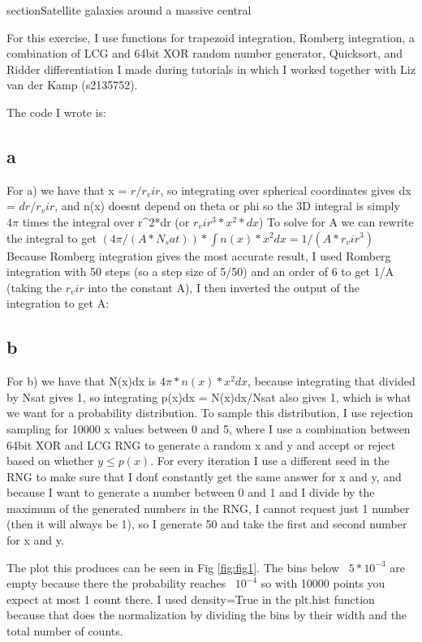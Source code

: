 section{Satellite galaxies around a massive central}

For this exercise, I use functions for trapezoid integration, Romberg integration, a combination of 
LCG and 64bit XOR random number generator, Quicksort, and Ridder differentiation I made during tutorials in 
which I worked together with Liz van der Kamp (s2135752).


The code I wrote is:


\subsection{a}

For a) we have that x = $r/r_vir$, so integrating over spherical coordinates gives dx = $dr/r_vir$, 
and n(x) doesnt depend on theta or phi so the 3D integral is simply $4\pi$ times the integral over 
r^2*dr (or $r_vir^3*x^2*dx$)
To solve for A we can rewrite the integral to get $(4\pi/(A*N_sat))*\int n(x)*x^2 dx = 1/(A*r_vir^3)$
Because Romberg integration gives the most accurate result, I used Romberg integration with 50 steps 
(so a step size of 5/50) and an order of 6 to get 1/A (taking the $r_vir$ into the constant A),
I then inverted the output of the integration to get A:


\subsection{b}

For b) we have that N(x)dx is $4\pi*n(x)*x^2 dx$, because integrating that divided by Nsat gives 1, 
so integrating p(x)dx = N(x)dx/Nsat also gives 1, which is what we want for a probability distribution.
To sample this distribution, I use rejection sampling for 10000 x values between 0 and 5,
where I use a combination between 64bit XOR and LCG RNG to generate a random x and y and accept or reject
based on whether $y \leq p(x)$. For every iteration I use a different seed in the RNG to make sure that I 
don\'t constantly get the same answer for x and y, and because I want to generate a number between 0 and 1 
and I divide by the maximum of the generated numbers in the RNG, I cannot request just 1 number 
(then it will always be 1), so I generate 50 and take the first and second number for x and y.

The plot this produces can be seen in Fig \ref{fig:fig1}. The bins below ~$5*10^{-3}$ are empty because there 
the probability reaches ~$10^{-4}$ so with 10000 points you expect at most 1 count there. 
I used density=True in the plt.hist function because that does the normalization by dividing the bins by 
their width and the total number of counts.

